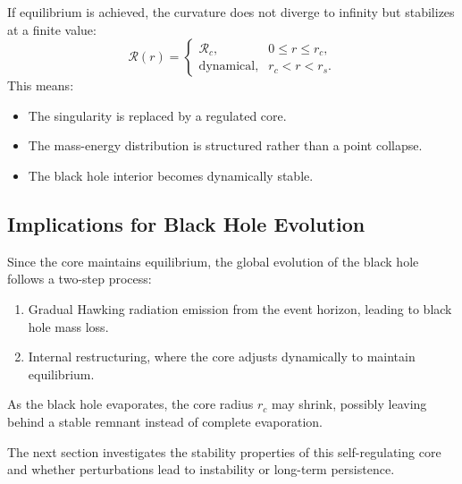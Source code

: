 If equilibrium is achieved, the curvature does not diverge to infinity but stabilizes at a finite value:
\begin{equation}
    \mathcal{R}(r) =
    \begin{cases}
        \mathcal{R}_c, & 0 \leq r \leq r_c, \\
        \text{dynamical}, & r_c < r < r_s.
    \end{cases}
\end{equation}
This means:
\begin{itemize}
    \item The singularity is replaced by a regulated core.
    \item The mass-energy distribution is structured rather than a point collapse.
    \item The black hole interior becomes dynamically stable.
\end{itemize}

\subsection{Implications for Black Hole Evolution}

Since the core maintains equilibrium, the global evolution of the black hole follows a two-step process:
\begin{enumerate}
    \item Gradual Hawking radiation emission from the event horizon, leading to black hole mass loss.
    \item Internal restructuring, where the core adjusts dynamically to maintain equilibrium.
\end{enumerate}

As the black hole evaporates, the core radius \( r_c \) may shrink, possibly leaving behind a stable remnant instead of complete evaporation.

The next section investigates the stability properties of this self-regulating core and whether perturbations lead to instability or long-term persistence.
